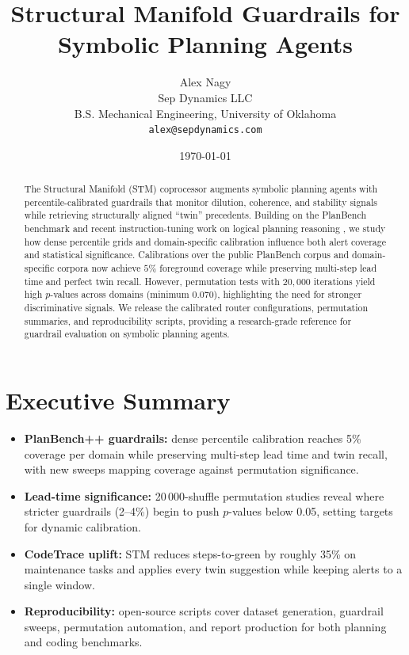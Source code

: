 \documentclass[11pt]{article}
\title{Structural Manifold Guardrails for Symbolic Planning Agents}
\author{Alex Nagy\\Sep Dynamics LLC\\B.S. Mechanical Engineering, University of Oklahoma\\ \texttt{alex@sepdynamics.com}}
\date{\today}
\begin{document}
\maketitle

\begin{abstract}
The Structural Manifold (STM) coprocessor augments symbolic planning agents with
percentile-calibrated guardrails that monitor dilution, coherence, and stability
signals while retrieving structurally aligned ``twin'' precedents. Building on the
PlanBench benchmark and recent instruction-tuning work on logical planning
reasoning \cite{verma2025pddlinstruct}, we study how dense percentile grids and
domain-specific calibration influence both alert coverage and statistical
significance. Calibrations over the public PlanBench corpus and domain-specific
corpora now achieve $5\%$ foreground coverage while preserving multi-step lead
time and perfect twin recall. However, permutation tests with $20{,}000$
iterations yield high $p$-values across domains (minimum $0.070$), highlighting
the need for stronger discriminative signals. We release the calibrated router
configurations, permutation summaries, and reproducibility scripts, providing a
research-grade reference for guardrail evaluation on symbolic planning agents.
\end{abstract}

\tableofcontents
\newpage

\section*{Executive Summary}
\begin{itemize}
  \item \textbf{PlanBench++ guardrails:} dense percentile calibration reaches 5\% coverage per domain while preserving multi-step lead time and twin recall, with new sweeps mapping coverage against permutation significance.
  \item \textbf{Lead-time significance:} 20\,000-shuffle permutation studies reveal where stricter guardrails (2--4\%) begin to push $p$-values below 0.05, setting targets for dynamic calibration.
  \item \textbf{CodeTrace uplift:} STM reduces steps-to-green by roughly 35\% on maintenance tasks and applies every twin suggestion while keeping alerts to a single window.
  \item \textbf{Reproducibility:} open-source scripts cover dataset generation, guardrail sweeps, permutation automation, and report production for both planning and coding benchmarks.
\end{itemize}
\end{document}
